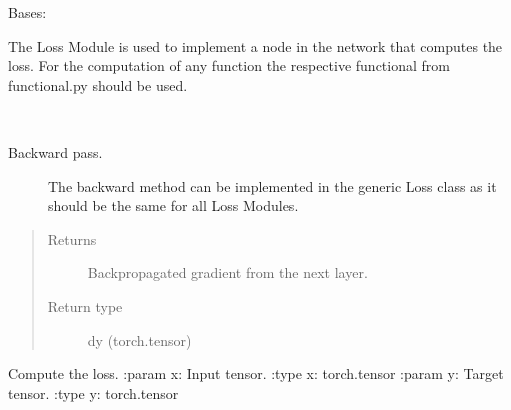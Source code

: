 \documentclass[letterpaper,10pt,english,openany,oneside]{sphinxmanual}
\begin{document}
\begin{fulllineitems}
\label{\detokenize{nn:nn.loss.Loss}}
Bases: {\hyperref[\detokenize{nn:nn.module.Module}]{}}

The Loss Module is used to implement a node in the network that computes the loss.
For the computation of any function the respective functional from functional.py should be used.

\begin{fulllineitems}
\label{\detokenize{nn:nn.loss.Loss.backward}}~\begin{description}
\item[{Backward pass.}] \leavevmode
The backward method can be implemented in the generic Loss class
as it should be the same for all Loss Modules.

\end{description}
\begin{quote}\begin{description}
\item[{Returns}] \leavevmode
Backpropagated gradient from the next layer.

\item[{Return type}] \leavevmode
dy (torch.tensor)

\end{description}\end{quote}

\end{fulllineitems}


\begin{fulllineitems}
\label{\detokenize{nn:nn.loss.Loss.forward}}
Compute the loss.
:param x: Input tensor.
:type x: torch.tensor
:param y: Target tensor.
:type y: torch.tensor

\end{fulllineitems}


\end{fulllineitems}
\end{document}
